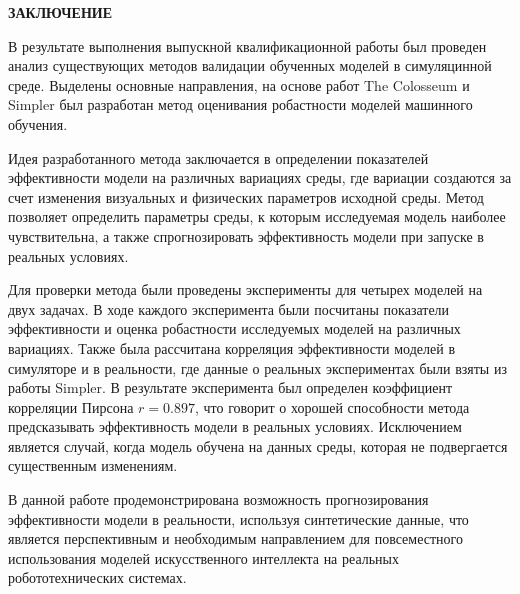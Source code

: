 \newpage
\begin{center}
  \textbf{\large ЗАКЛЮЧЕНИЕ}
\end{center}

В результате выполнения выпускной квалификационной работы был проведен анализ существующих методов валидации обученных моделей в симуляцинной среде. Выделены основные направления, на основе работ The Colosseum \cite{pumacay2024colosseum} и Simpler \cite{li24simpler} был разработан метод оценивания робастности моделей машинного обучения. 

Идея разработанного метода заключается в определении показателей эффективности модели на различных вариациях среды, где вариации создаются за счет изменения визуальных и физических параметров исходной среды. Метод позволяет определить параметры среды, к которым исследуемая модель наиболее чувствительна, а также спрогнозировать эффективность модели при запуске в реальных условиях.  

Для проверки метода были проведены эксперименты для четырех моделей на двух задачах. В ходе каждого эксперимента были посчитаны показатели эффективности и оценка робастности исследуемых моделей на различных вариациях. Также была рассчитана корреляция эффективности моделей в симуляторе и в реальности, где данные о реальных экспериментах были взяты из работы Simpler. В результате эксперимента был определен коэффициент корреляции Пирсона $r = 0.897$, что говорит о хорошей способности метода предсказывать эффективность модели в реальных условиях. Исключением является случай, когда модель обучена на данных среды, которая не подвергается существенным изменениям.

В данной работе продемонстрирована возможность прогнозирования эффективности модели в реальности, используя синтетические данные, что является перспективным и необходимым направлением для повсеместного использования моделей искусственного интеллекта на реальных робототехнических системах.

